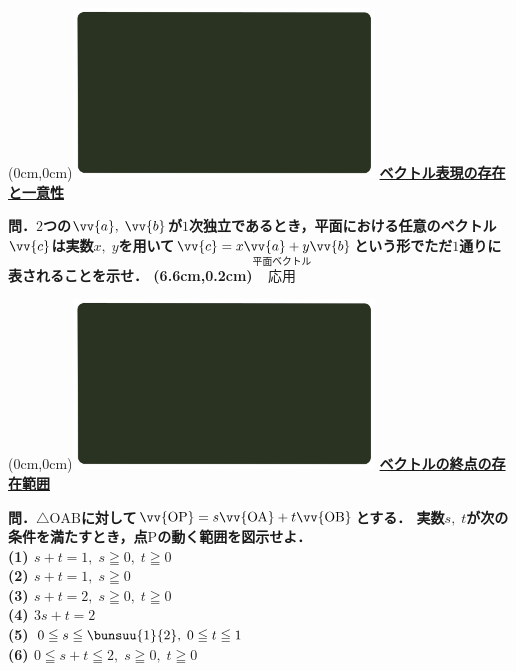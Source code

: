 \documentclass[10pt,
fleqn,
dvipdfmx,
uplatex
]{jsarticle}
\begin{document}
\newpage



\at(0cm,0cm){\includegraphics[width=8cm,bb=0 0 1920 1080]{./youtube/thumbnails/templates/smart_background/平面ベクトル.jpeg}}
{\color{orange}\bf\boldmath\Large\underline{ベクトル表現の存在と一意性}}\vspace{0.3zw}

\large 
\bf\boldmath 問．$2$つの$\vv {a},\;\vv {b}$が$1$次独立であるとき，平面における任意のベクトル$\vv {c}$は実数$x,\;‌y$を用いて$\vv {c}=x\vv {a}+y\vv {b}$という形でただ$1$通りに表されることを示せ．
\at(6.6cm,0.2cm){\small\color{bradorange}$\overset{\text{平面ベクトル}}{\text{応用}}$}


\newpage



\at(0cm,0cm){\includegraphics[width=8cm,bb=0 0 1920 1080]{./youtube/thumbnails/templates/smart_background/平面ベクトル.jpeg}}
{\color{orange}\bf\boldmath\Large\underline{ベクトルの終点の存在範囲}}\vspace{0.3zw}

\small 
\bf\boldmath 問．$\triangle \text{OAB}$に対して$\vv {\text{OP}}=s\vv {\text{OA}}+t\vv {\text{OB}}$とする．
実数$s,\;t$が次の条件を満たすとき，点$\text{P}$の動く範囲を図示せよ．\\
(1)  $s+t=1,\;s\geqq 0,\;t\geqq 0$\\
(2)  $s+t=1,\;s\geqq 0$\\
(3)  $s+t=2,\;s\geqq 0,\;t\geqq 0$\\
(4)  $3s+t=2$\\
(5)  $0\leqq s\leqq \bunsuu{1}{2},\;0\leqq t\leqq 1$\\
(6)  $0\leqq s+t\leqq 2,\;s\geqq 0,\;t\geqq 0$\\
\end{document}
